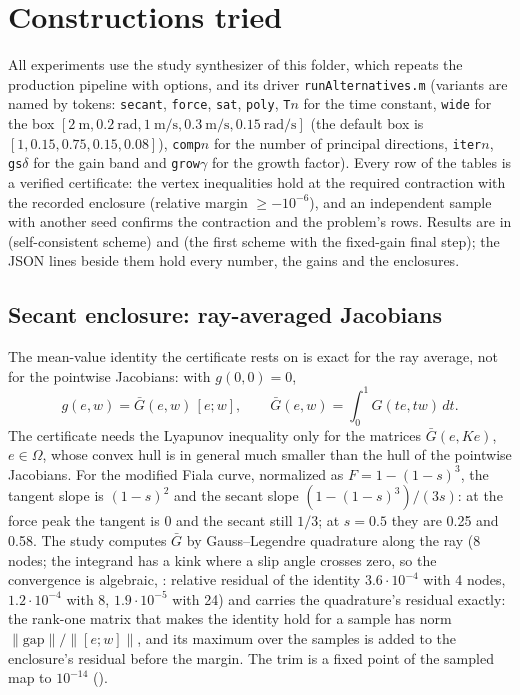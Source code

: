 \documentclass[11pt]{article}
\begin{document}
\section{Constructions tried}
All experiments use the study synthesizer
 of this folder, which repeats the
production pipeline with options, and its driver \texttt{runAlternatives.m}
(variants are named by tokens: \texttt{secant}, \texttt{force},
\texttt{sat}, \texttt{poly}, \texttt{T$n$} for the time constant,
\texttt{wide} for the box $[2~\text{m},0.2~\text{rad},1~\text{m/s},0.3~\text{m/s},0.15~\text{rad/s}]$
(the default box is $[1,0.15,0.75,0.15,0.08]$), \texttt{comp$n$} for the
number of principal directions, \texttt{iter$n$}, \texttt{gs$\delta$} for the
gain band and \texttt{grow$\gamma$} for the growth factor). Every row of the
tables is a verified certificate: the vertex inequalities hold at the
required contraction with the recorded enclosure (relative margin
$\ge -10^{-6}$), and an independent sample with another seed confirms the
contraction and the problem's rows. Results are in 
(self-consistent scheme) and  (the
first scheme with the fixed-gain final step); the JSON lines beside them
hold every number, the gains and the enclosures.

\subsection{Secant enclosure: ray-averaged Jacobians}
The mean-value identity the certificate rests on is exact for the ray
average, not for the pointwise Jacobians: with $g(0,0)=0$,
\[
g(e,w)=\bar G(e,w)\,[e;w],\qquad \bar G(e,w)=\int_0^1 G(te,tw)\,dt .
\]
The certificate needs the Lyapunov inequality only for the matrices
$\bar G(e,Ke)$, $e\in\Omega$, whose convex hull is in general much smaller
than the hull of the pointwise Jacobians. For the modified Fiala curve,
normalized as $F=1-(1-s)^3$, the tangent slope is $(1-s)^2$ and the secant
slope $(1-(1-s)^3)/(3s)$: at the force peak the tangent is 0 and the secant
still $1/3$; at $s=0.5$ they are 0.25 and 0.58. The study computes $\bar G$ by
Gauss--Legendre quadrature along the ray (8 nodes; the integrand has a kink
where a slip angle crosses zero, so the convergence is algebraic,
: relative residual of the identity
$3.6\cdot10^{-4}$ with 4 nodes, $1.2\cdot10^{-4}$ with 8, $1.9\cdot10^{-5}$
with 24) and carries the quadrature's residual exactly: the rank-one matrix
that makes the identity hold for a sample has norm
$\|\text{gap}\|/\|[e;w]\|$, and its maximum over the samples is added to the
enclosure's residual before the margin. The trim is a fixed point of the
sampled map to $10^{-14}$ ().
\end{document}
